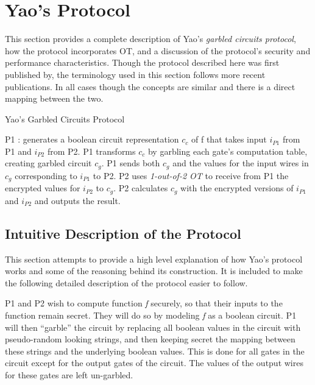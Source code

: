 \section{Yao's Protocol}

This section provides a complete description of Yao's \emph{garbled circuits protocol}, how the protocol incorporates \ac{OT}, and a discussion of the protocol's security and performance characteristics.  Though the protocol described here was first published by\cite{goldreich1987play}, the terminology used in this section follows more recent publications\cite{hazay2010efficient}. In all cases though the concepts are similar and there is a direct mapping between the two.

\begin{algorithm}[H]
    \caption{Yao's Garbled Circuits Protocol}
    \label{alg:yao}
    \begin{algorithmic}[1]
        \STATE \ac{P1} : generates a boolean circuit representation $c_c$ of \ac{f} that takes input $i_{P1}$ from \ac{P1} and $i_{P2}$ from \ac{P2}.
        \STATE \ac{P1} transforms $c_c$ by garbling each gate's computation table, creating garbled circuit $c_g$.
        \STATE \ac{P1} sends both $c_g$ and the values for the input wires in $c_g$ corresponding to $i_{P1}$ to \ac{P2}.
        \STATE \ac{P2} uses \emph{1-out-of-2 \ac{OT}} to receive from \ac{P1} the encrypted values for $i_{P2}$ to $c_g$.
        \STATE \ac{P2} calculates $c_g$ with the encrypted versions of $i_{P1}$ and $i_{P2}$ and outputs the result.
    \end{algorithmic}
\end{algorithm}


\subsection{Intuitive Description of the Protocol}

This section attempts to provide a high level explanation of how Yao's protocol works and some of the reasoning behind its construction. It is included to make the following detailed description of the protocol easier to follow.

\ac{P1} and \ac{P2} wish to compute function \emph{f} securely, so that their inputs to the function remain secret. They will do so by modeling \emph{f} as a boolean circuit. \ac{P1} will then ``garble'' the circuit by replacing all boolean values in the circuit with pseudo-random looking strings, and then keeping secret the mapping between these strings and the underlying boolean values. This is done for all gates in the circuit except for the output gates of the circuit.  The values of the output wires for these gates are left un-garbled.

